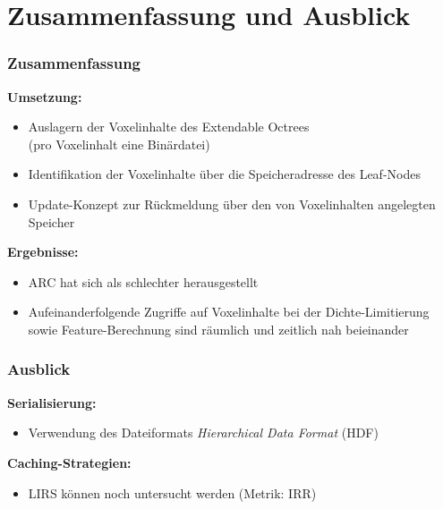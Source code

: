 \documentclass[presentation]{beamer}
\newcommand{ 
\OutlineAtBeginSection}{
	\AtBeginSection[]
	{
		\begin{frame}{Überblick}
		\tableofcontents[currentsection]
		\end{frame}
	}
}
\begin{document}
\OutlineAtBeginSection
\section{Zusammenfassung und Ausblick}
\begin{frame}
	\frametitle{Zusammenfassung}
	\color{dd-gray} \textbf{Umsetzung:} \color{black} 
	\begin{itemize}
		\item Auslagern der Voxelinhalte des Extendable Octrees\\(pro Voxelinhalt eine Binärdatei)
		\item Identifikation der Voxelinhalte über die Speicheradresse des Leaf-Nodes
		\item Update-Konzept zur Rückmeldung über den von Voxelinhalten angelegten Speicher
		\baselineskip
	\end{itemize} 
	\color{dd-gray} \textbf{Ergebnisse:} \color{black} 
	\begin{itemize}
		\item ARC hat sich als schlechter herausgestellt
		\item Aufeinanderfolgende Zugriffe auf Voxelinhalte bei der Dichte-Limitierung sowie Feature-Berechnung sind räumlich und zeitlich nah beieinander
	\end{itemize} 
\end{frame}
 
 
\begin{frame}
	\frametitle{Ausblick}
	\color{dd-gray} \textbf{Serialisierung:} \color{black} 
	\begin{itemize}
		\item Verwendung des Dateiformats \emph{Hierarchical Data Format} (HDF)
	\end{itemize} 
	\baselineskip
	\color{dd-gray} \textbf{Caching-Strategien:} \color{black} 
	\begin{itemize}
		\item LIRS können noch untersucht werden (Metrik: IRR) %
	\end{itemize}
\end{frame}

\nocite{podlipnig2003survey}
\nocite{karedla1994caching}
\nocite{cherkasova1998improving} 
\end{document}

